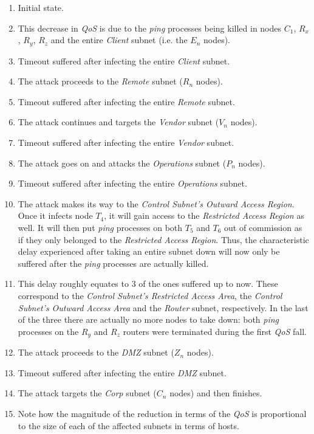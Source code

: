             \begin{enumerate}
                \item Initial state.
                \item This decrease in \textit{QoS} is due to the \textit{ping} processes being killed in nodes $C_1$, $R_x$, $R_y$, $R_z$ and the entire \textit{Client} subnet (i.e. the $E_n$ nodes).
                \item Timeout suffered after infecting the entire \textit{Client} subnet.
                \item The attack proceeds to the \textit{Remote} subnet ($R_n$ nodes).
                \item Timeout suffered after infecting the entire \textit{Remote} subnet.
                \item The attack continues and targets the \textit{Vendor} subnet ($V_n$ nodes).
                \item Timeout suffered after infecting the entire \textit{Vendor} subnet.
                \item The attack goes on and attacks the \textit{Operations} subnet ($P_n$ nodes).
                \item Timeout suffered after infecting the entire \textit{Operations} subnet.
                \item The attack makes its way to the \textit{Control Subnet's Outward Access Region}. Once it infects node $T_4$, it will gain access to the \textit{Restricted Access Region} as well. It will then put \textit{ping} processes on both $T_5$ and $T_6$ out of commission as if they only belonged to the \textit{Restricted Access Region}. Thus, the characteristic delay experienced after taking an entire subnet down will now only be suffered after the \textit{ping} processes are actually killed.
                \item This delay roughly equates to $3$ of the ones suffered up to now. These correspond to the \textit{Control Subnet's Restricted Access Area}, the \textit{Control Subnet's Outward Access Area} and the \textit{Router} subnet, respectively. In the last of the three there are actually no more nodes to take down: both \textit{ping} processes on the $R_y$ and $R_z$ routers were terminated during the first \textit{QoS} fall.
                \item The attack proceeds to the \textit{DMZ} subnet ($Z_n$ nodes).
                \item Timeout suffered after infecting the entire \textit{DMZ} subnet.
                \item The attack targets the \textit{Corp} subnet ($C_n$ nodes) and then finishes.
                \item Note how the magnitude of the reduction in terms of the \textit{QoS} is proportional to the size of each of the affected subnets in terms of hosts.
            \end{enumerate}

